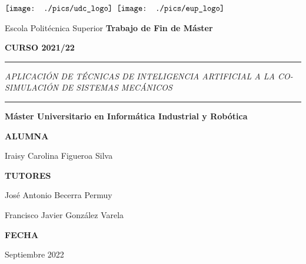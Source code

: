 

\frontmatter
\thispagestyle{empty}

$\vcenter{\hbox{\texttt{[image: ./pics/udc\_logo]}}}$
\hfill
$\vcenter{\hbox{\texttt{[image: ./pics/eup\_logo]}}}$

\vskip 1.0cm


\begin{center}
	\LARGE Escola Politécnica Superior
	\vskip 1cm
	\textbf{Trabajo de Fin de Máster}
	
	\textbf{CURSO 2021/22}
	
	\vskip 1.5cm
	
	{\color{udccolor} \rule{\textwidth}{0.1cm}}
	
	\vskip 1cm
	
	\LARGE \textit{APLICACIÓN DE TÉCNICAS DE INTELIGENCIA ARTIFICIAL A LA CO-SIMULACIÓN DE SISTEMAS MECÁNICOS}
	
	\vskip 1cm
	
	{\color{udccolor} \rule{\textwidth}{0.1cm}}
	
	\vskip 1cm
	
	\Large \textbf{Máster Universitario en Informática Industrial y Robótica}
	
\end{center}

\vskip 2cm

\large \textbf{ALUMNA}

\hskip 7.5cm Iraisy Carolina Figueroa Silva

\large \textbf{TUTORES}

\hskip 7.5cm José Antonio Becerra Permuy

\hskip 7.5cm Francisco Javier González Varela

\large \textbf{FECHA}

\hskip 7.5cm Septiembre 2022

\clearpage
